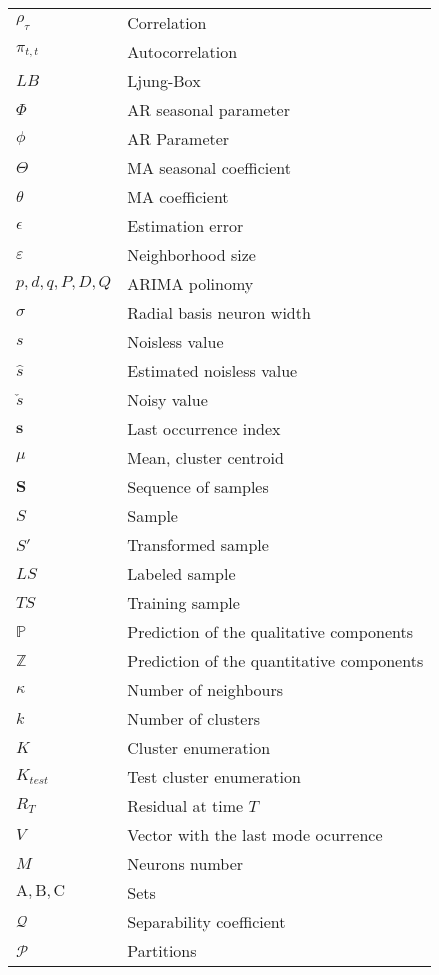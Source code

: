 \begin{table}[!htb]
\centering
  \caption*{}
\begin{tabular}{l l }
$ \rho_\tau$ & Correlation\\
$ \pi_{t,t}$ & Autocorrelation\\
$ LB$ & Ljung-Box\\
$ \Phi $ & AR seasonal parameter\\
$\phi $ & AR Parameter\\
$\Theta $ & MA seasonal coefficient \\
$\theta $ & MA coefficient \\
$ \epsilon$ & Estimation error\\
$ \varepsilon $ & Neighborhood size \\
$p,d,q,P,D,Q$ & ARIMA polinomy\\
$ \sigma $ & Radial basis neuron width\\
$ s$ & Noisless value\\
$ \hat{s}$ & Estimated noisless value\\
$ \check{s} $ & Noisy value\\
$ \mathbf{s} $ & Last occurrence index\\
$ \mu $ & Mean, cluster centroid\\
$ \mathbf{S} $ & Sequence of samples\\
$ S $ & Sample\\
$ S' $ & Transformed sample\\
$ LS$ & Labeled sample\\
$ TS$ & Training sample\\
$ \mathds{P}$ & Prediction of the qualitative components\\
$ \mathds{Z}$ & Prediction of the quantitative components\\
$ \kappa $ & Number of neighbours\\
$ k$ & Number of clusters\\
$ K$ & Cluster enumeration\\
$ K_{test}$ & Test cluster enumeration\\
$ R_T$ & Residual at time $T$\\
$ V $ & Vector with the last mode ocurrence\\
$ M$ & Neurons number\\
$ \mathrm{A,B,C}$ & Sets\\
$ \mathcal{Q}$ & Separability coefficient\\
$ \mathcal{P}$ & Partitions \\

 
\end{tabular}
\label{tab:parameters}
\end{table}



